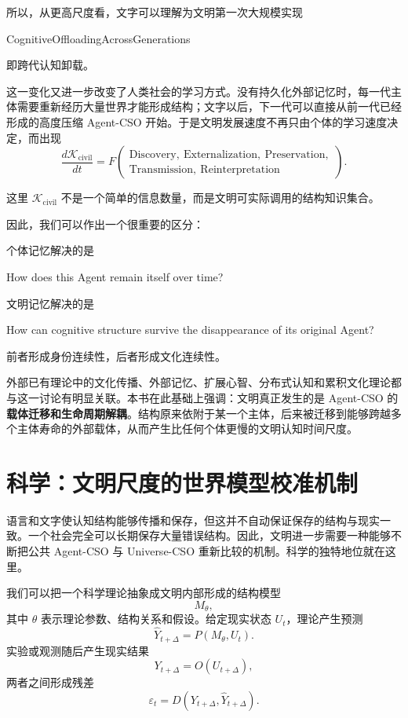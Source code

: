所以，从更高尺度看，文字可以理解为文明第一次大规模实现
\begin{statementbox}
CognitiveOffloadingAcrossGenerations
\end{statementbox}
即跨代认知卸载。

这一变化又进一步改变了人类社会的学习方式。没有持久化外部记忆时，每一代主体需要重新经历大量世界才能形成结构；文字以后，下一代可以直接从前一代已经形成的高度压缩 Agent-CSO 开始。于是文明发展速度不再只由个体的学习速度决定，而出现
\[
\frac{d\mathcal{K}_{\mathrm{civil}}}{dt}
=
F\!\left(
\begin{gathered}
\mathrm{Discovery},\ \mathrm{Externalization},\ \mathrm{Preservation},\\
\mathrm{Transmission},\ \mathrm{Reinterpretation}
\end{gathered}
\right).
\]

这里 $\mathcal{K}_{\mathrm{civil}}$ 不是一个简单的信息数量，而是文明可实际调用的结构知识集合。

因此，我们可以作出一个很重要的区分：

个体记忆解决的是
\begin{statementbox}
How does this Agent remain itself over time?
\end{statementbox}

文明记忆解决的是
\begin{statementbox}
How can cognitive structure survive the disappearance of its original Agent?
\end{statementbox}

前者形成身份连续性，后者形成文化连续性。

外部已有理论中的文化传播、外部记忆、扩展心智、分布式认知和累积文化理论都与这一讨论有明显关联。本书在此基础上强调：文明真正发生的是 Agent-CSO 的\textbf{载体迁移和生命周期解耦}。结构原来依附于某一个主体，后来被迁移到能够跨越多个主体寿命的外部载体，从而产生比任何个体更慢的文明认知时间尺度。


\section{科学：文明尺度的世界模型校准机制}

语言和文字使认知结构能够传播和保存，但这并不自动保证保存的结构与现实一致。一个社会完全可以长期保存大量错误结构。因此，文明进一步需要一种能够不断把公共 Agent-CSO 与 Universe-CSO 重新比较的机制。科学的独特地位就在这里。

我们可以把一个科学理论抽象成文明内部形成的结构模型
\[
M_\theta,
\]
其中 $\theta$ 表示理论参数、结构关系和假设。给定现实状态 $U_t$，理论产生预测
\[
\hat{Y}_{t+\Delta}
=
P(M_\theta,U_t).
\]
实验或观测随后产生现实结果
\[
Y_{t+\Delta}
=
O(U_{t+\Delta}),
\]
两者之间形成残差
\[
\varepsilon_t
=
D(
Y_{t+\Delta},
\hat{Y}_{t+\Delta}
).
\]

